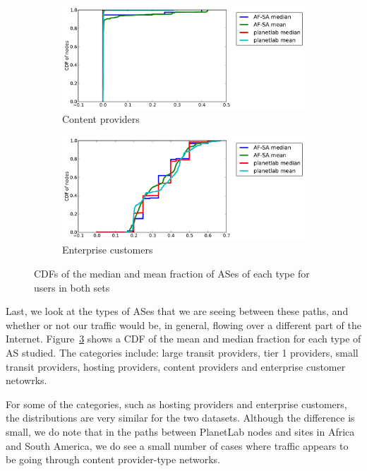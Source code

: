 \documentclass{sig-alternate-10pt}
\begin{document}
\begin{figure}
\begin{subfigure}[b]{0.45\textwidth}
\centering
    \includegraphics[width=1.0\linewidth]{figs/fractions_of_types-cp.pdf}
    \caption{Content providers}
\label{fig:as_cp}
\end{subfigure}
\begin{subfigure}[b]{0.45\textwidth}
\centering
    \includegraphics[width=1.0\linewidth]{figs/fractions_of_types-ec.pdf}
    \caption{Enterprise customers}
\label{fig:as_ec}
\end{subfigure}
\caption{CDFs of the median and mean fraction of ASes of each type 
for users in both sets}
\label{fig:as_types}
\end{figure}

Last, we look at the types of ASes that we are seeing between these paths, and
whether or not our traffic would be, in general, flowing over a different part
of the Internet. Figure~\ref{fig:as_types} shows a CDF of the mean and median
fraction for each type of AS studied. The categories include: large transit
providers, tier 1 providers, small transit providers, hosting providers,
content providers and enterprise customer netowrks.

For some of the categories, such as hosting providers and enterprise customers,
the distributions are very similar for the two datasets. Although the
difference is small, we do note that in the paths between PlanetLab nodes and
sites in Africa and South America, we do see a small number of cases where traffic 
appears to be going through content provider-type networks. 
\end{document}
